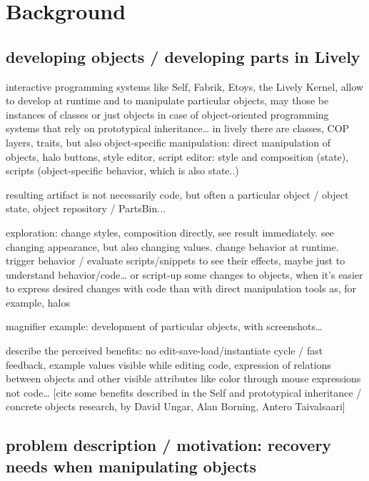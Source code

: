 \section{Background} \label{sec:BACKGROUND}




\subsection{developing objects / developing parts in Lively}

interactive programming systems like Self, Fabrik, Etoys, the Lively Kernel, allow to develop at runtime and to manipulate particular objects, may those be instances of classes or just objects in case of object-oriented programming systems that rely on prototypical inheritance… in lively there are classes, COP layers, traits, but also object-specific manipulation:
direct manipulation of objects, halo buttons, style editor, script editor: style and composition (state), scripts (object-specific behavior, which is also state..)

resulting artifact is not necessarily code, but often a particular object / object state, object repository / PartsBin...

exploration: change styles, composition directly, see result immediately. see changing appearance, but also changing values. change behavior at runtime. trigger behavior / evaluate scripts/snippets to see their effects, maybe just to understand behavior/code… or script-up some changes to objects, when it’s easier to express desired changes with code than with direct manipulation tools as, for example, halos

magnifier example: development of particular objects, with screenshots…

describe the perceived benefits: no edit-save-load/instantiate cycle / fast feedback, example values visible while editing code, expression of relations between objects and other visible attributes like color through mouse expressions not code… 
[cite some benefits described in the Self and prototypical inheritance / concrete objects research, by David Ungar, Alan Borning, Antero Taivalsaari]



\subsection{problem description / motivation: recovery needs when manipulating objects}

